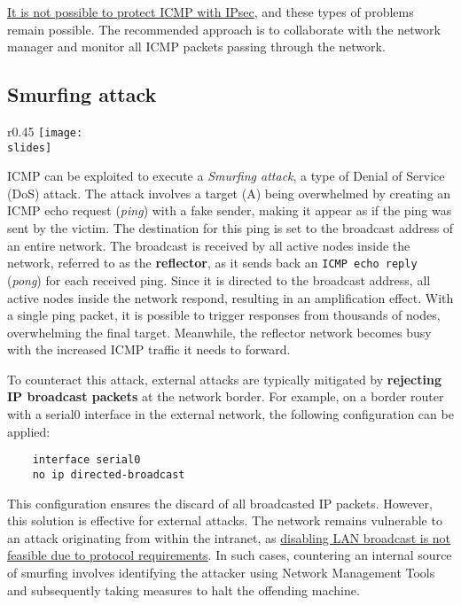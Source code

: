 \ul{It is not possible to protect ICMP with IPsec}, and these types of problems remain possible. The recommended approach is to collaborate with the network manager and monitor all ICMP packets passing through the network.

\subsection{Smurfing attack}
\begin{wrapfigure}{r}{0.45\textwidth}
    \centering
    \texttt{[image: \\slides]}
\end{wrapfigure}
ICMP can be exploited to execute a \textit{Smurfing attack}, a type of Denial of Service (DoS) attack.
The attack involves a target (A) being overwhelmed by creating an ICMP echo request (\textit{ping}) with a fake sender, making it appear as if the ping was sent by the victim. The destination for this ping is set to the broadcast address of an entire network. The broadcast is received by all active nodes inside the network, referred to as the \textbf{reflector}, as it sends back an \texttt{ICMP echo reply} (\textit{pong}) for each received ping. Since it is directed to the broadcast address, all active nodes inside the network respond, resulting in an amplification effect. With a single ping packet, it is possible to trigger responses from thousands of nodes, overwhelming the final target. Meanwhile, the reflector network becomes busy with the increased ICMP traffic it needs to forward.

To counteract this attack, external attacks are typically mitigated by \textbf{rejecting IP broadcast packets} at the network border. For example, on a border router with a serial0 interface in the external network, the following configuration can be applied:

\begin{verbatim}
    interface serial0
    no ip directed-broadcast    
\end{verbatim}

This configuration ensures the discard of all broadcasted IP packets. However, this solution is effective for external attacks. The network remains vulnerable to an attack originating from within the intranet, as \ul{disabling LAN broadcast is not feasible due to protocol requirements}. In such cases, countering an internal source of smurfing involves identifying the attacker using Network Management Tools and subsequently taking measures to halt the offending machine.



